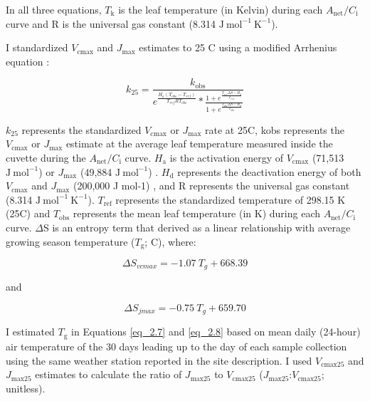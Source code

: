 \noindent In all three equations, $T_\mathrm{k}$ is the leaf temperature (in Kelvin) during each $A_\mathrm{net}/C_\mathrm{i}$ curve and R is the universal gas constant (8.314 $\mathrm{J\ mol^{-1}\ K^{-1}}$).

I standardized $V_\mathrm{cmax}$ and $J_\mathrm{max}$ estimates to 25 \textdegree{}C using a modified Arrhenius equation :

\begin{equation} \label{eq_2.6}
    k_\mathrm{25}=\frac{k_\mathrm{obs}}{e^{\frac{H_a(T_{obs}-T_{ref})}{T_{ref}RT_{obs}}}*\frac{1+e^{\frac{T_{ref}\Delta S-H_d}{T_{ref}}}}{1+e^{\frac{T_{obs}\Delta S-H_d}{T_{obs}}}}}
\end{equation}

\noindent $k_\mathrm{25}$ represents the standardized $V_\mathrm{cmax}$ or $J_\mathrm{max}$ rate at 25\textdegree{}C, kobs represents the $V_\mathrm{cmax}$ or $J_\mathrm{max}$ estimate at the average leaf temperature measured inside the cuvette during the $A_\mathrm{net}/C_\mathrm{i}$ curve. $H_\mathrm{a}$ is the activation energy of $V_{\mathrm{cmax}}$ (71,513 $\mathrm{J\ mol^{-1}}$)  or $J_\mathrm{max}$ (49,884 $\mathrm{J\ mol^{-1}}$) . $H_\mathrm{d}$ represents the deactivation energy of both $V_\mathrm{cmax}$ and $J_\mathrm{max}$ (200,000 J mol-1) , and R represents the universal gas constant (8.314 $\mathrm{J\ mol^{-1}\ K^{-1}}$). $T_\mathrm{ref}$ represents the standardized temperature of 298.15 K (25\textdegree{}C) and $T_\mathrm{obs}$ represents the mean leaf temperature (in K) during each $A_\mathrm{net}/C_\mathrm{i}$ curve. $\Delta$S is an entropy term that  derived as a linear relationship with average growing season temperature ($T_\mathrm{g}$; \textdegree{}C), where: 

\begin{equation} \label{eq_2.7}
    \Delta S_{vcmax}=-1.07\ T_{g}+668.39
\end{equation}
    
\noindent and
   
\begin{equation} \label{eq_2.8}
    \Delta S_{jmax}=-0.75\ T_{g}+659.70
\end{equation}

\noindent I estimated $T_\mathrm{g}$ in Equations \ref{eq_2.7} and \ref{eq_2.8} based on mean daily (24-hour) air temperature of the 30 days leading up to the day of each sample collection using the same weather station reported in the site description. I used $V_\mathrm{cmax25}$ and $J_\mathrm{max25}$ estimates to calculate the ratio of $J_\mathrm{max25}$ to $V_\mathrm{cmax25}$ ($J_\mathrm{max25}$:$V_\mathrm{cmax25}$; unitless).

